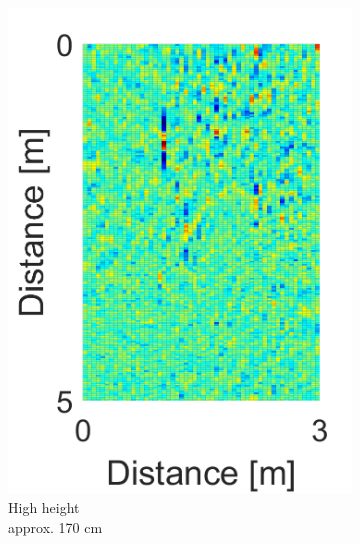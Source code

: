 \begin{figure}[H]
\begin{subfigure}[b]{0.29\textwidth}
\includegraphics[width=\textwidth]{figures/Norm_space_3.png}
\caption{High height \\ approx. 170 cm}
\label{Norm_high}
\end{subfigure}
\begin{subfigure}[b]{0.1\textwidth}

\end{subfigure}
\end{figure}
